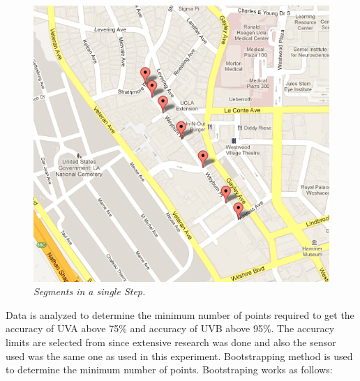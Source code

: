 \documentclass[10pt]{sigplan-proc-varsize}
\begin{document}
\begin{figure}
\begin{center}
\includegraphics[scale=0.35]{segmentsInAStep.png}
\caption{\small \sl Segments in a single Step.\label{fig:segmentsInAStep}}
\end{center}
\end{figure}

Data is analyzed to determine the minimum number of points required to get the accuracy of UVA above 75\% and accuracy of UVB above 95\%. The accuracy limits are selected from \cite{uvguardian} since extensive research was done and also the sensor used was the same one as used in this experiment. Bootstrapping method is used to determine the minimum number of points. Bootstraping works as follows:
\\
\end{document}
